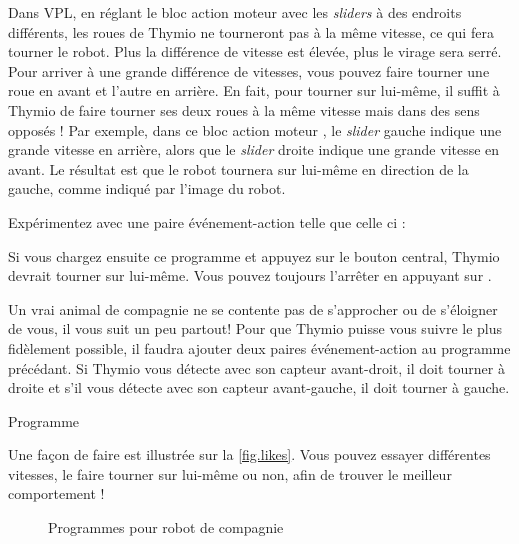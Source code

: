 Dans VPL, en réglant le bloc action moteur avec les \textit{sliders} à des endroits différents, les roues de Thymio ne tourneront pas à la même vitesse, ce qui fera tourner le robot.
Plus la différence de vitesse est élevée, plus le virage sera serré.
Pour arriver à une grande différence de vitesses, vous pouvez faire tourner une roue en avant et l'autre en arrière.
En fait, pour tourner sur lui-même, il suffit à Thymio de faire tourner ses deux roues à la même vitesse mais dans des sens opposés !
Par exemple, dans ce bloc action moteur , le \textit{slider} gauche indique une grande vitesse en arrière, alors que le \textit{slider} droite indique une grande vitesse en avant.
Le résultat est que le robot tournera sur lui-même en direction de la gauche, comme indiqué par l'image du robot.

Expérimentez avec une paire événement-action telle que celle ci : 

Si vous chargez ensuite ce programme et appuyez sur le bouton central, Thymio devrait tourner sur lui-même. Vous pouvez toujours l'arrêter en appuyant sur .




Un vrai animal de compagnie ne se contente pas de s'approcher ou de s'éloigner de vous, il vous suit un peu partout! 
Pour que Thymio puisse vous suivre le plus fidèlement possible, il faudra ajouter deux paires événement-action au programme précédant.
Si Thymio vous détecte avec son capteur avant-droit, il doit tourner à droite et s'il vous détecte avec son capteur avant-gauche, il doit tourner à gauche.

{\raggedleft \hfill Programme }

Une façon de faire est illustrée sur la \cref{fig.likes}.
Vous pouvez essayer différentes vitesses, le faire tourner sur lui-même ou non, afin de trouver le meilleur comportement !

\begin{figure}
	\hfill
	\caption{Programmes pour robot de compagnie}
\end{figure}

